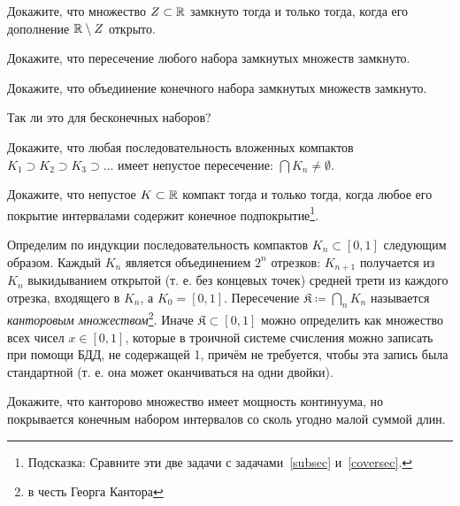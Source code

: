 \documentclass[a4paper, 12pt, num=29]{listok}
\begin{document}
\begin{problem}
	Докажите, что множество $Z \subset \mathbb{R}$ замкнуто тогда и только тогда, когда его дополнение $\mathbb{R} \setminus Z$ открыто.
\end{problem}
\begin{problem}
	Докажите, что пересечение любого набора замкнутых множеств замкнуто.
\end{problem}
\begin{problem}
\begin{probparts}
	\item Докажите, что объединение конечного набора замкнутых множеств замкнуто.
	\item Так ли это для бесконечных наборов?
\end{probparts}
\end{problem}
\begin{problem}
	Докажите, что любая последовательность вложенных компактов $K_1 \supset K_2 \supset K_3 \supset \ldots$
	имеет непустое пересечение: $\bigcap K_n \ne \emptyset$.
\end{problem}
\begin{problem}
	Докажите, что непустое $K \subset \mathbb{R}$ компакт тогда и только тогда, когда любое его покрытие интервалами содержит конечное подпокрытие\footnote{%
		Подсказка: Сравните эти две задачи с задачами~\ref{subsec} и~\ref{coversec}.
	}.
\end{problem}
\begin{definition}
	Определим по индукции последовательность компактов $K_n \subset \left [ 0, 1 \right ]$ следующим образом.
	Каждый $K_n$ является объединением $2^n$ отрезков: $K_{n + 1}$ получается из $K_n$ выкидыванием открытой
	(т. е. без концевых точек) средней трети из каждого отрезка, входящего в $K_n$, а $K_0 = \left [ 0, 1 \right ]$.
	Пересечение $\mathfrak{K} \coloneq \bigcap_n K_n$ называется \textit{канторовым множеством}\footnote{%
	в честь Георга Кантора
	}.
	Иначе $\mathfrak{K} \subset \left [ 0, 1 \right ]$ можно определить как множество всех чисел $x \in \left [ 0, 1 \right ]$,
	которые в троичной системе счисления можно записать при помощи БДД, не содержащей 1, причём не требуется, чтобы эта запись была стандартной
	(т. е. она может оканчиваться на одни двойки).
\end{definition}
\begin{problem}
	Докажите, что канторово множество имеет мощность континуума, но покрывается конечным набором интервалов со сколь угодно малой суммой длин.
\end{problem}
\end{document}
